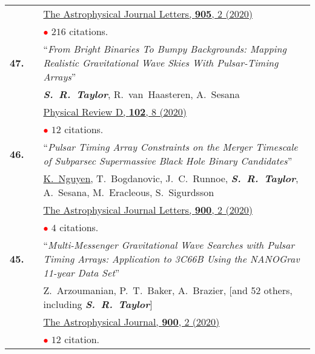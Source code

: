 \documentclass[11pt,letterpaper,sans]{moderncv}
\begin{document}
{\begin{longtable}{rp{0.3cm}p{15.8cm}}
&& \href{https://ui.adsabs.harvard.edu/link_gateway/2020ApJ...905L..34A/doi:10.3847/2041-8213/abd401}{{\color{color1} The Astrophysical Journal Letters, \textbf{905}, 2 (2020)}} \vspace{0.09cm}\\
&& \textcolor{red}{$\bullet$} $216$ citations. \vspace{0.09cm}\\
\textbf{47.} & & ``\textit{From Bright Binaries To Bumpy Backgrounds: Mapping Realistic Gravitational Wave Skies With Pulsar-Timing Arrays}'' \\ 
&&\textit{\textbf{S.~R.~Taylor}}, R.~van~Haasteren, A.~Sesana \\
&& \href{https://ui.adsabs.harvard.edu/link_gateway/2020PhRvD.102h4039T/doi:10.1103/PhysRevD.102.084039}{{\color{color1} Physical Review D, \textbf{102}, 8 (2020)}} \vspace{0.09cm} \\
&& \textcolor{red}{$\bullet$} $12$ citations. \vspace{0.09cm}\\
\textbf{46.} & & ``\textit{Pulsar Timing Array Constraints on the Merger Timescale of Subparsec Supermassive Black Hole Binary Candidates}'' \\ 
&&\underline{K.~Nguyen}, T.~Bogdanovic, J.~C.~Runnoe, \textit{\textbf{S.~R.~Taylor}}, A.~Sesana, M.~Eracleous, S.~Sigurdsson \\
&& \href{https://ui.adsabs.harvard.edu/link_gateway/2020ApJ...900L..42N/doi:10.3847/2041-8213/abb2ab}{{\color{color1} The Astrophysical Journal Letters, \textbf{900}, 2 (2020)}} \vspace{0.09cm} \\
&& \textcolor{red}{$\bullet$} $4$ citations. \vspace{0.09cm}\\
\textbf{45.} & & ``\textit{Multi-Messenger Gravitational Wave Searches with Pulsar Timing Arrays: Application to 3C66B Using the NANOGrav 11-year Data Set}'' \\ 
&&Z.~Arzoumanian, P.~T.~Baker, A.~Brazier, [and 52 others, including \textit{\textbf{S.~R.~Taylor}}] \\
&& \href{https://ui.adsabs.harvard.edu/link_gateway/2020ApJ...900..102A/doi:10.3847/1538-4357/ababa1}{{\color{color1} The Astrophysical Journal, \textbf{900}, 2 (2020)}} \\
&& \textcolor{red}{$\bullet$} $12$ citation. \vspace{0.09cm}\\

\end{longtable}}
\end{document}
